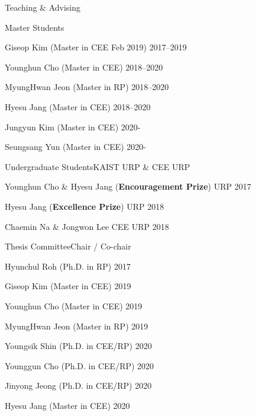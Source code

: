 \begin{rSection}{Teaching \& Advising}
\begin{rSubsection}{Master Students}{}{}{}
  \item Giseop Kim (Master in \ac{CEE} Feb 2019) \hfill 2017--2019
  \item Younghun Cho (Master in \ac{CEE}) \hfill 2018--2020
  \item MyungHwan Jeon (Master in \ac{RP}) \hfill 2018--2020
  \item Hyesu Jang (Master in \ac{CEE}) \hfill 2018--2020
  \item Jungyun Kim (Master in \ac{CEE}) \hfill 2020-
  \item Seungsang Yun (Master in \ac{CEE}) \hfill 2020-
\end{rSubsection}

\begin{rSubsection}{Undergraduate Students}{}{KAIST \acf{URP} \& CEE URP}{}
  \item Younghun Cho \& Hyesu Jang ({\bf Encouragement Prize}) \hfill URP 2017
  \item Hyesu Jang ({\bf Excellence Prize}) \hfill URP 2018
  \item Chaemin Na \& Jongwon Lee \hfill CEE URP 2018
\end{rSubsection}

\begin{rSubsection}{Thesis Committee}{}{Chair / Co-chair }{}
  \item Hyunchul Roh (Ph.D. in \ac{RP}) \hfill 2017
  \item Giseop Kim (Master in \ac{CEE}) \hfill 2019
  \item Younghun Cho (Master in \ac{CEE}) \hfill 2019
  \item MyungHwan Jeon (Master in \ac{RP}) \hfill 2019
  \item Youngsik Shin (Ph.D. in \ac{CEE}/\ac{RP}) \hfill 2020
  \item Younggun Cho (Ph.D. in \ac{CEE}/\ac{RP}) \hfill 2020
  \item Jinyong Jeong (Ph.D. in \ac{CEE}/\ac{RP}) \hfill 2020
  \item Hyesu Jang (Master in \ac{CEE}) \hfill 2020
\end{rSubsection}

\end{rSection}
